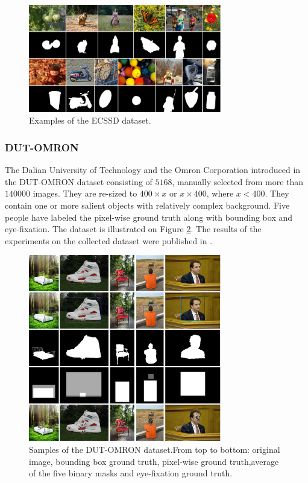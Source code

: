 \begin{figure}[h]
\begin{center}
\includegraphics[width=0.75\textwidth]{fig/ECSSD}
\end{center}
\caption{Examples of the ECSSD dataset.}
\label{fig:ecssd}
\end{figure}

\subsubsection{DUT-OMRON}
The Dalian University of Technology and the Omron Corporation introduced in the DUT-OMRON dataset \cite{dut-omron_db} consisting of $5168$, manually selected from more than $140 000$ images. They are re-sized to $400 \times x$ or $x \times 400$, where  $x < 400$. They contain one or more salient objects with relatively complex background. Five people have labeled the pixel-wise ground truth along with bounding box and eye-fixation. The dataset is illustrated on Figure \ref{fig:dut-omron}. The results of the experiments on the collected dataset were published in \cite{yang2013saliency}.

\begin{figure}[h]
\begin{center}
\includegraphics[width=0.75\textwidth]{fig/DUT-OMRON}
\end{center}
\caption{Samples of the DUT-OMRON dataset.From top to bottom: original image, bounding box ground truth, pixel-wise ground truth,average of the five binary masks and eye-fixation ground truth. }
\label{fig:dut-omron}
\end{figure}

